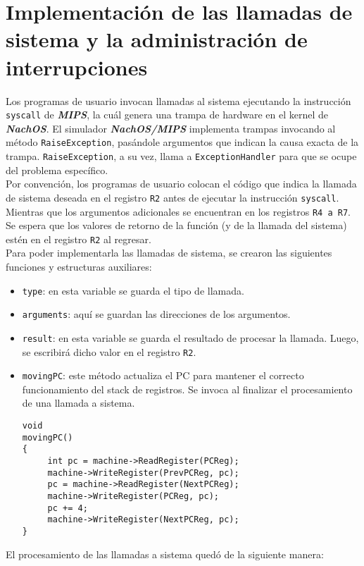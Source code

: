 \section{Implementación de las llamadas de sistema y la administración de interrupciones}
Los programas de usuario invocan llamadas al sistema ejecutando la instrucción \texttt{syscall} de \textbf{\textit{MIPS}}, la cuál genera una trampa de hardware en el kernel de \textbf{\textit{NachOS}}. El simulador \textbf{\textit{NachOS/MIPS}} implementa trampas invocando al método \texttt{RaiseException}, pasándole argumentos que indican la causa exacta de la trampa. \texttt{RaiseException}, a su vez, llama a \texttt{ExceptionHandler} para que se ocupe del problema específico.\\
Por convención, los programas de usuario colocan el código que indica la llamada de sistema deseada en el registro \texttt{R2} antes de ejecutar la instrucción \texttt{syscall}. Mientras que los argumentos adicionales se encuentran en los registros \texttt{R4 a R7}. Se espera que los valores de retorno de la función (y de la llamada del sistema) estén en el registro \texttt{R2} al regresar.\\
Para poder implementarla las llamadas de sistema, se crearon las siguientes funciones y estructuras auxiliares:
\begin{itemize}
    \item \texttt{type}: en esta variable se guarda el tipo de llamada.
    \item \texttt{arguments}: aquí se guardan las direcciones de los argumentos.
    \item \texttt{result}: en esta variable se guarda el resultado de procesar la llamada. Luego, se escribirá dicho valor en el registro \texttt{R2}.
    \item \texttt{movingPC}: este método actualiza el PC para mantener el correcto funcionamiento del stack de registros. Se invoca al finalizar el procesamiento de una llamada a sistema.
        \begin{lstlisting}[style=C]
void
movingPC()
{
     int pc = machine->ReadRegister(PCReg);
     machine->WriteRegister(PrevPCReg, pc);
     pc = machine->ReadRegister(NextPCReg);
     machine->WriteRegister(PCReg, pc);
     pc += 4;
     machine->WriteRegister(NextPCReg, pc);
}
        \end{lstlisting}
\end{itemize}
El procesamiento de las llamadas a sistema quedó de la siguiente manera:
